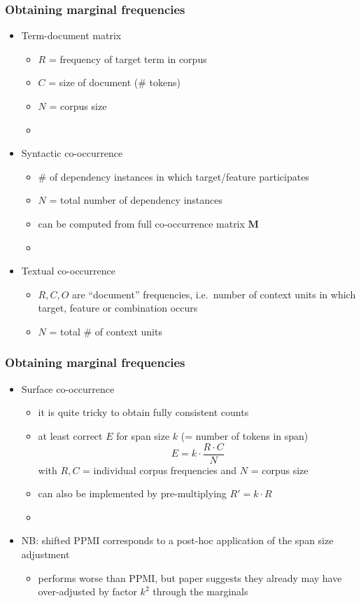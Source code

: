 \documentclass[t]{beamer} %
\begin{document}
\begin{frame}
  \frametitle{Obtaining marginal frequencies}

  \begin{itemize}
  \item Term-document matrix
    \begin{itemize}
    \item $R$ = frequency of target term in corpus
    \item $C$ = size of document (\# tokens)
    \item $N$ = corpus size
    \item[]
    \end{itemize}
  \item<2-> Syntactic co-occurrence
    \begin{itemize}
    \item \# of dependency instances in which target/feature participates
    \item $N$ = total number of dependency instances 
    \item can be computed from full co-occurrence matrix $\mathbf{M}$
    \item[]
    \end{itemize}
  \item<3-> Textual co-occurrence
    \begin{itemize}
    \item $R, C, O$ are ``document'' frequencies, i.e.\ number of context units in which target, feature or combination occurs
    \item $N$ = total \# of context units
    \end{itemize}
  \end{itemize}
\end{frame}

\begin{frame}
  \frametitle{Obtaining marginal frequencies}

  \begin{itemize}
  \item Surface co-occurrence
    \begin{itemize}
    \item it is quite tricky to obtain fully consistent counts \citep{Evert:08}
    \item at least correct $E$ for span size $k$ (= number of tokens in span)
      \[
      E = k\cdot \frac{R\cdot C}{N}
      \]
      with $R, C$ = individual corpus frequencies and $N$ = corpus size
    \item can also be implemented by pre-multiplying $R' = k\cdot R$
    \item[]
    \end{itemize}
  \item<2-> NB: shifted PPMI \citep{Levy:Goldberg:14} corresponds to a post-hoc application of the span size adjustment
    \begin{itemize}
    \item performs worse than PPMI, but paper suggests they already
      may have over-adjusted by factor $k^2$ through the marginals
    \end{itemize}
  \end{itemize}
\end{frame}
\end{document}
